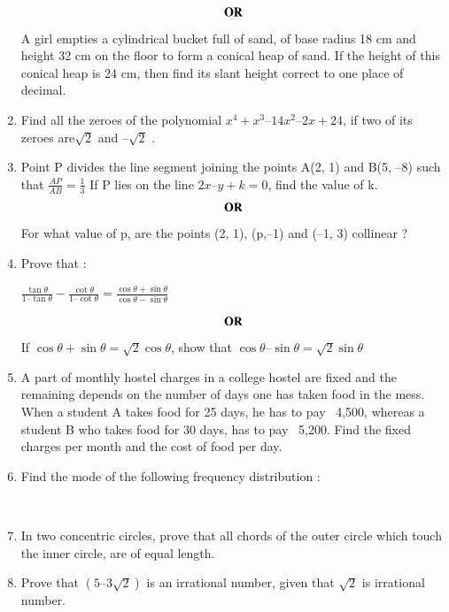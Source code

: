 \documentclass[journal,12pt,twocolumn]{IEEEtran}
\begin{document}
\begin{enumerate}
\begin{figure}[h!]
 \end{figure}
 \begin{align}
    \centering \vec{OR}\nonumber
\end{align}
A girl empties a cylindrical bucket full of sand, of base radius 18 cm and height 32 cm on the floor to form a conical heap of sand. If the height of this conical heap is 24 cm, then find its slant height correct to one place of decimal.
 \medskip
 \item Find all the zeroes of the polynomial $x^4 + x^3 – 14x^2 – 2x + 24$, if two of its zeroes are$\sqrt{2}$  and –$\sqrt{2}$  .
 \medskip
 \item Point P divides the line segment joining the points A(2, 1) and B(5, –8) such that
 $ \displaystyle\frac{AP}{AB}=\displaystyle\frac{1}{3}$ If P lies on the line $2x – y + k = 0$, find the value of k.
  \begin{align}
    \centering \vec{OR}\nonumber
\end{align}
For what value of p, are the points (2, 1), (p,–1) and (–1, 3) collinear ?\\
\item Prove that :
\begin{center}
 $ \displaystyle\frac{\tan\theta}{1 – \tan\theta} - \displaystyle\frac{\cot\theta}{1 – \cot\theta} = \displaystyle\frac{\cos\theta+\sin\theta}{\cos\theta - \sin\theta}$
\end{center}
  \begin{align}
    \centering \vec{OR}\nonumber
\end{align}
If $\cos\theta + \sin\theta=\sqrt{2} \cos\theta$, show that $\cos\theta – \sin\theta = \sqrt{2}\sin\theta$
 \medskip
\item A part of monthly hostel charges in a college hostel are fixed and the remaining depends on the number of days one has taken food in the mess. When a student A takes food for 25 days, he has to pay \rupee~4,500, whereas a student B who takes food for 30 days, has to pay \rupee~5,200. Find the fixed charges per month and the cost of food per day.\\
\item Find the mode of the following frequency distribution :
	\begin{table}[hbt]
\centering
\end{table}
\\
 \item In two concentric circles, prove that all chords of the outer circle which touch the inner circle, are of equal length.
 \medskip
 \item Prove that $(5 – 3\sqrt{2})$ is an irrational number, given that $\sqrt{2}$ is irrational number.
 \bigskip

\end{enumerate}
\end{document}
